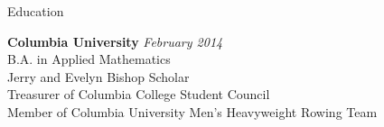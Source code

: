 \documentclass{resume} %
\begin{document}

\begin{rSection}{Education}

{\bf Columbia University} \hfill {\em February 2014} \\ 
B.A. in Applied Mathematics \\
Jerry and Evelyn Bishop Scholar \\
Treasurer of Columbia College Student Council \\
Member of Columbia University Men's Heavyweight Rowing Team
\end{rSection}

\end{document}
